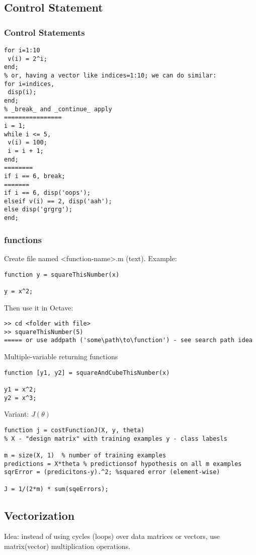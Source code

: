 \documentclass{scrartcl}
\begin{document}
\subsection{Control Statement}
\label{5-5}
\subsubsection{Control Statements}
\begin{verbatim}
for i=1:10
 v(i) = 2^i;
end;
% or, having a vector like indices=1:10; we can do similar:
for i=indices,
 disp(i);
end;
% _break_ and _continue_ apply
================
i = 1;
while i <= 5,
 v(i) = 100;
 i = i + 1;
end;
========
if i == 6, break;
=======
if i == 6, disp('oops');
elseif v(i) == 2, disp('aah');
else disp('grgrg');
end;
\end{verbatim}
\subsubsection{functions}
Create file named <function-name>.m (text). Example:
\begin{verbatim}
function y = squareThisNumber(x)

y = x^2;
\end{verbatim}
Then use it in Octave:
\begin{verbatim}
>> cd <folder with file>
>> squareThisNumber(5)
===== or use addpath ('some\path\to\function') - see search path idea
\end{verbatim}
Multiple-variable returning functions
\begin{verbatim}
function [y1, y2] = squareAndCubeThisNumber(x)

y1 = x^2;
y2 = x^3;
\end{verbatim}
Variant: $J(\theta)$
\begin{verbatim}
function j = costFunctionJ(X, y, theta)
% X - "design matrix" with training examples y - class labesls

m = size(X, 1)  % number of training examples
predictions = X*theta % predictionsof hypothesis on all m examples
sqrError = (predicitons-y).^2; %squared error (element-wise)

J = 1/(2*m) * sum(sqeErrors);
\end{verbatim}
\subsection{Vectorization}
\label{5-6}
Idea: instead of using cycles (loops) over data matrices or vectors,
use matrix(vector) multiplication operations.
\end{document}
